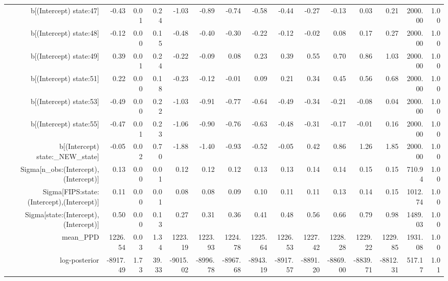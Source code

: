 \begin{table}[ht]
\begin{tabular}{rrrrrrrrrrrrrrr}
  b[(Intercept) state:47] & -0.43 & 0.01 & 0.24 & -1.03 & -0.89 & -0.74 & -0.58 & -0.44 & -0.27 & -0.13 & 0.03 & 0.21 & 2000.00 & 1.00 \\ 
  b[(Intercept) state:48] & -0.12 & 0.00 & 0.15 & -0.48 & -0.40 & -0.30 & -0.22 & -0.12 & -0.02 & 0.08 & 0.17 & 0.27 & 2000.00 & 1.00 \\ 
  b[(Intercept) state:49] & 0.39 & 0.01 & 0.24 & -0.22 & -0.09 & 0.08 & 0.23 & 0.39 & 0.55 & 0.70 & 0.86 & 1.03 & 2000.00 & 1.00 \\ 
  b[(Intercept) state:51] & 0.22 & 0.00 & 0.18 & -0.23 & -0.12 & -0.01 & 0.09 & 0.21 & 0.34 & 0.45 & 0.56 & 0.68 & 2000.00 & 1.00 \\ 
  b[(Intercept) state:53] & -0.49 & 0.00 & 0.22 & -1.03 & -0.91 & -0.77 & -0.64 & -0.49 & -0.34 & -0.21 & -0.08 & 0.04 & 2000.00 & 1.00 \\ 
  b[(Intercept) state:55] & -0.47 & 0.01 & 0.23 & -1.06 & -0.90 & -0.76 & -0.63 & -0.48 & -0.31 & -0.17 & -0.01 & 0.16 & 2000.00 & 1.00 \\ 
  b[(Intercept) state:\_NEW\_state] & -0.05 & 0.02 & 0.70 & -1.88 & -1.40 & -0.93 & -0.52 & -0.05 & 0.42 & 0.86 & 1.26 & 1.85 & 2000.00 & 1.00 \\ 
  Sigma[n\_obs:(Intercept),(Intercept)] & 0.13 & 0.00 & 0.01 & 0.12 & 0.12 & 0.12 & 0.13 & 0.13 & 0.14 & 0.14 & 0.15 & 0.15 & 710.94 & 1.00 \\ 
  Sigma[FIPS:state:(Intercept),(Intercept)] & 0.11 & 0.00 & 0.01 & 0.08 & 0.08 & 0.09 & 0.10 & 0.11 & 0.11 & 0.13 & 0.14 & 0.15 & 1012.74 & 1.00 \\ 
  Sigma[state:(Intercept),(Intercept)] & 0.50 & 0.00 & 0.13 & 0.27 & 0.31 & 0.36 & 0.41 & 0.48 & 0.56 & 0.66 & 0.79 & 0.98 & 1489.03 & 1.00 \\ 
  mean\_PPD & 1226.54 & 0.03 & 1.34 & 1223.19 & 1223.93 & 1224.78 & 1225.64 & 1226.53 & 1227.42 & 1228.28 & 1229.22 & 1229.85 & 1931.08 & 1.00 \\ 
  log-posterior & -8917.49 & 1.73 & 39.33 & -9015.02 & -8996.78 & -8967.68 & -8943.19 & -8917.57 & -8891.20 & -8869.00 & -8839.71 & -8812.31 & 517.17 & 1.01 \\ 
   \hline
\end{tabular}
\end{table}
